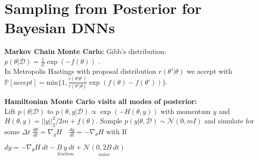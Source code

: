 \section*{Sampling from Posterior for Bayesian DNNs}

\textbf{Markov Chain Monte Carlo:}
Gibb's distribution: \(p(\theta|\mathcal{D}) =\! \tfrac{1}{Z}\! \exp(-f(\theta))\) .\\
In Metropolis Hastings with proposal distribution \(r(\theta'|\theta)\) we accept with $\mathbb{P}[accept] \!=\! \mathrm{min}\{1,\!\tfrac{r(\theta|\theta')}{r(\theta'|\theta)}\! \exp(f(\theta)\!-\!f(\theta'))\}$.

\textbf{Hamiltonian Monte Carlo visits all modes of posterior:}\\
Lift \(p(\theta | \mathcal{D})\) to \(p(\theta,y | \mathcal{D}) \propto \exp(-H(\theta,y))\) with momentum \(y\) and \(H(\theta,y) = ||y||_2^2 / 2m + f(\theta)\). Sample 
$p(y|\theta, \mathcal{D}) \sim \mathcal{N}(0, mI)$ and simulate for some \(\Delta t\) \(\tfrac{d\theta}{dt} = \nabla_y H \quad \tfrac{dy}{dt} = - \nabla_\theta H\) with  If 

\hspace{35pt} $dy = - \nabla_\theta H\ dt - \underset{\mathrm friction}{B\ y\ dt} + \underset{noise}{\mathcal{N}(0, 2B \ dt)}$